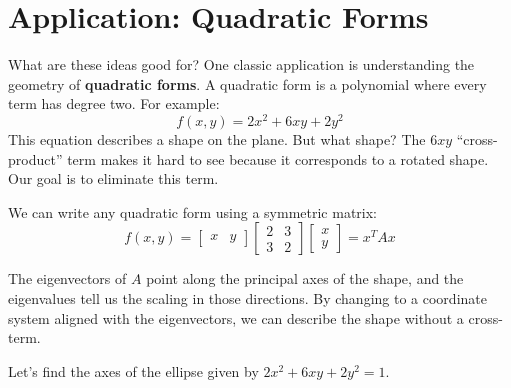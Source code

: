 \documentclass[
  letterpaper,
  DIV=11,
  numbers=noendperiod]{scrreprt}
\begin{document}
\section{Application: Quadratic
Forms}\label{application-quadratic-forms}

What are these ideas good for? One classic application is understanding
the geometry of \textbf{quadratic forms}. A quadratic form is a
polynomial where every term has degree two. For example:
\[ f(x, y) = 2x^2 + 6xy + 2y^2 \] This equation describes a shape on the
plane. But what shape? The \(6xy\) ``cross-product'' term makes it hard
to see because it corresponds to a rotated shape. Our goal is to
eliminate this term.

We can write any quadratic form using a symmetric matrix:
\[ f(x, y) = \begin{bmatrix} x & y \end{bmatrix} \begin{bmatrix} 2 & 3 \\ 3 & 2 \end{bmatrix} \begin{bmatrix} x \\ y \end{bmatrix} = x^T A x \]

The eigenvectors of \(A\) point along the principal axes of the shape,
and the eigenvalues tell us the scaling in those directions. By changing
to a coordinate system aligned with the eigenvectors, we can describe
the shape without a cross-term.

Let's find the axes of the ellipse given by \(2x^2 + 6xy + 2y^2 = 1\).
\end{document}
